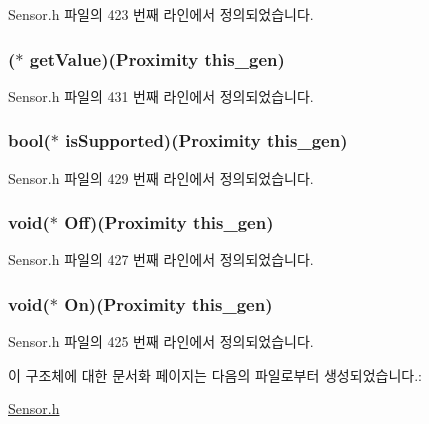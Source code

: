 Sensor.\-h 파일의 423 번째 라인에서 정의되었습니다.

\hypertarget{struct___proximity_abf3276a84c1e43e8e5ff5ecb6c665ee1}{
\subsubsection[{get\-Value}]{($\ast$  get\-Value)({\bf Proximity} this\-\_\-gen)}}\label{struct___proximity_abf3276a84c1e43e8e5ff5ecb6c665ee1}


Sensor.\-h 파일의 431 번째 라인에서 정의되었습니다.

\hypertarget{struct___proximity_adfb2002e855b02ccf6f3dbcd636723ea}{
\subsubsection[{is\-Supported}]{\setlength{\rightskip}{0pt plus 5cm}bool($\ast$  is\-Supported)({\bf Proximity} this\-\_\-gen)}}\label{struct___proximity_adfb2002e855b02ccf6f3dbcd636723ea}


Sensor.\-h 파일의 429 번째 라인에서 정의되었습니다.

\hypertarget{struct___proximity_a25912193ba611f9680ac4e897f0d4489}{
\subsubsection[{Off}]{\setlength{\rightskip}{0pt plus 5cm}void($\ast$  Off)({\bf Proximity} this\-\_\-gen)}}\label{struct___proximity_a25912193ba611f9680ac4e897f0d4489}


Sensor.\-h 파일의 427 번째 라인에서 정의되었습니다.

\hypertarget{struct___proximity_a4a9a95df8401d22845c7cc21392de00a}{
\subsubsection[{On}]{\setlength{\rightskip}{0pt plus 5cm}void($\ast$  On)({\bf Proximity} this\-\_\-gen)}}\label{struct___proximity_a4a9a95df8401d22845c7cc21392de00a}


Sensor.\-h 파일의 425 번째 라인에서 정의되었습니다.



이 구조체에 대한 문서화 페이지는 다음의 파일로부터 생성되었습니다.\-:\begin{DoxyCompactItemize}
\item 
\hyperlink{_sensor_8h}{Sensor.\-h}\end{DoxyCompactItemize}

